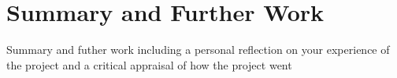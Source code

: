 \section{Summary and Further Work}
{\color{red}Summary and futher work including a personal reflection on your experience of the project and a critical appraisal of how the project went}